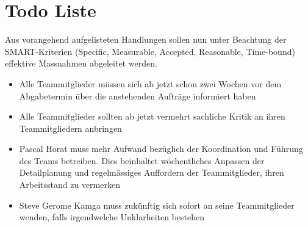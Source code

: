 
\chapter{Todo Liste}

Aus vorangehend aufgelisteten Handlungen sollen nun unter Beachtung der 
SMART-Kriterien (Specific, Measurable, Accepted, Reasonable, Time-bound) 
effektive Massnahmen abgeleitet werden. 

\begin{itemize}

\item Alle Teammitglieder müssen sich ab jetzt schon zwei Wochen vor dem Abgabetermin über die anstehenden Aufträge informiert haben
\item Alle Teammitglieder sollten ab jetzt vermehrt sachliche Kritik an ihren Teammitgliedern anbringen  
\item Pascal Horat muss mehr Aufwand bezüglich der Koordination und Führung \cite{belbin1981management} des Teams betreiben. Dies beinhaltet wöchentliches Anpassen der Detailplanung und regelmässiges Auffordern der Teammitglieder, ihren Arbeitsstand zu vermerken
\item Steve Gerome Kamga muss zukünftig sich sofort an seine Teammitglieder wenden, falls irgendwelche Unklarheiten bestehen

\end{itemize}